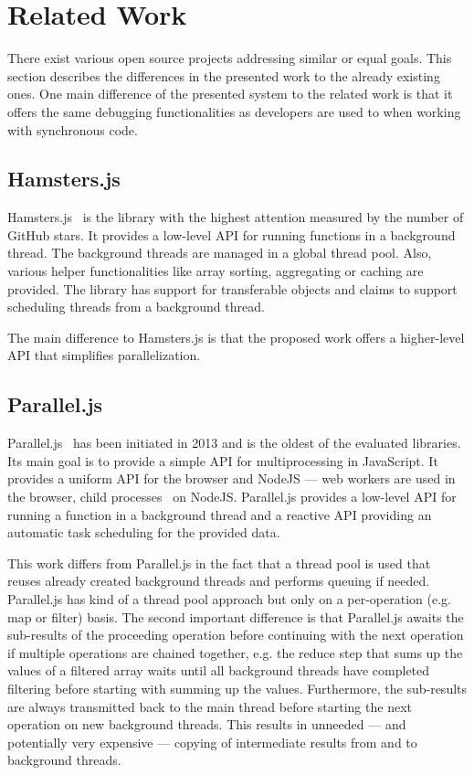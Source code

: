 \section{Related Work}\label{sec:related-work}
There exist various open source projects addressing similar or equal goals. This section describes the differences in the presented work to the already existing ones. One main difference of the presented system to the related work is that it offers the same debugging functionalities as developers are used to when working with synchronous code.

\subsection{Hamsters.js}
Hamsters.js~\cite{hamstersjs} is the library with the highest attention measured by the number of GitHub stars. It provides a low-level API for running functions in a background thread. The background threads are managed in a global thread pool. Also, various helper functionalities like array sorting, aggregating or caching are provided. The library has support for transferable objects and claims to support scheduling threads from a background thread. 

The main difference to Hamsters.js is that the proposed work offers a higher-level API that simplifies parallelization. 

\subsection{Parallel.js}
Parallel.js~\cite{SavitzkyMayr2016} has been initiated in 2013 and is the oldest of the evaluated libraries. Its main goal is to provide a simple API for multiprocessing in JavaScript. It provides a uniform API for the browser and NodeJS --- web workers are used in the browser, child processes~\cite{childProcess} on NodeJS. Parallel.js provides a low-level API for running a function in a background thread and a reactive API providing an automatic task scheduling for the provided data. 

This work differs from Parallel.js in the fact that a thread pool is used that reuses already created background threads and performs queuing if needed. Parallel.js has kind of a thread pool approach but only on a per-operation (e.g. map or filter) basis. The second important difference is that Parallel.js awaits the sub-results of the proceeding operation before continuing with the next operation if multiple operations are chained together, e.g. the reduce step that sums up the values of a filtered array waits until all background threads have completed filtering before starting with summing up the values. Furthermore, the sub-results are always transmitted back to the main thread before starting the next operation on new background threads. This results in unneeded --- and potentially very expensive --- copying of intermediate results from and to background threads.


